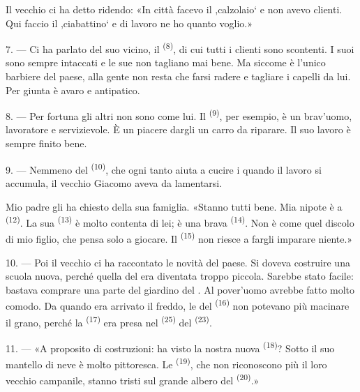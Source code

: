 Il vecchio ci ha detto ridendo: «In città facevo il ,calzolaio‘ e non avevo clienti.
Qui faccio il ,ciabattino‘ e di lavoro ne ho quanto voglio.»

7. --- Ci ha parlato del suo vicino, il  \textsuperscript{(8)}, di cui
tutti i clienti sono scontenti. I suoi  sono sempre intaccati e le sue
 non tagliano mai bene. Ma siccome è l'unico barbiere del paese, alla
gente non resta che farsi radere e tagliare i capelli da lui. Per giunta è avaro e
antipatico.

8. --- Per fortuna gli altri  non sono come lui. Il
 \textsuperscript{(9)}, per esempio, è un brav'uomo, lavoratore e
servizievole. È un piacere dargli un carro da riparare. Il suo lavoro è sempre finito
bene.

9. --- Nemmeno del  \textsuperscript{(10)}, che ogni tanto aiuta a
cucire i  quando il lavoro si accumula, il vecchio Giacomo aveva da
lamentarsi.

Mio padre gli ha chiesto della sua famiglia. «Stanno tutti bene. Mia nipote è a
 \textsuperscript{(12)}. La sua  \textsuperscript{(13)}
è molto contenta di lei; è una brava  \textsuperscript{(14)}. Non è
come quel discolo di mio figlio, che pensa solo a giocare. Il 
\textsuperscript{(15)} non riesce a fargli imparare niente.»

\VUsaut{3.0mm}
\VUsaut{3.0mm}

10. --- Poi il vecchio ci ha raccontato le novità del paese. Si doveva costruire una
scuola nuova, perché quella del  era diventata troppo piccola.
Sarebbe stato facile: bastava comprare una parte del giardino del .
Al pover'uomo avrebbe fatto molto comodo. Da quando era arrivato il freddo, le
 del  \textsuperscript{(16)} non potevano più macinare il
grano, perché la  \textsuperscript{(17)} era presa nel
 \textsuperscript{(25)} del 
\textsuperscript{(23)}.

11. --- «A proposito di costruzioni: ha visto la nostra nuova 
\textsuperscript{(18)}? Sotto il suo mantello di neve è molto pittoresca. Le
 \textsuperscript{(19)}, che non riconoscono più il loro vecchio
campanile, stanno tristi sul grande albero del 
\textsuperscript{(20)}.»

